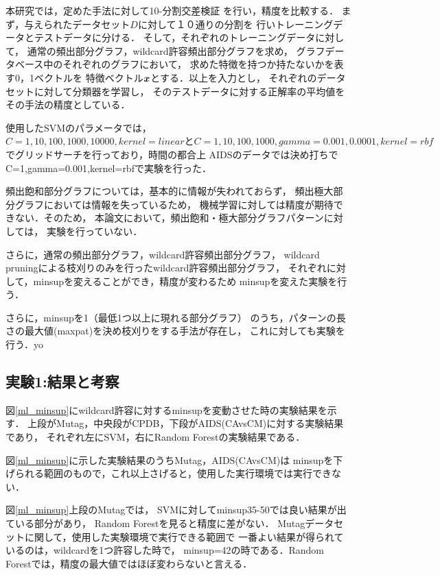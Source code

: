本研究では，定めた手法に対して10-分割交差検証
を行い，精度を比較する．
まず，与えられたデータセット$D$に対して１０通りの分割を
行いトレーニングデータとテストデータに分ける．
そして，それぞれのトレーニングデータに対して，
通常の頻出部分グラフ，wildcard許容頻出部分グラフを求め，
グラフデータベース中のそれぞれのグラフにおいて，
求めた特徴を持つか持たないかを表す0，1ベクトルを
特徴ベクトル$\mbox{\boldmath $x$}$とする．以上を入力とし，
それぞれのデータセットに対して分類器を学習し，
そのテストデータに対する正解率の平均値をその手法の精度としている．

使用したSVMのパラメータでは，
$C=1, 10,100,1000,10000, kernel=linearと
C=1,10,100,1000,gamma=0.001,0.0001,kernel=rbf$
でグリッドサーチを行っており，時間の都合上
AIDSのデータでは決め打ちでC=1,gamma=0.001,kernel=rbfで実験を行った．


頻出飽和部分グラフについては，基本的に情報が失われておらず，
頻出極大部分グラフにおいては情報を失っているため，
機械学習に対しては精度が期待できない．そのため，
本論文において，頻出飽和・極大部分グラフパターンに対しては，
実験を行っていない．

さらに，通常の頻出部分グラフ，wildcard許容頻出部分グラフ，
wildcard pruningによる枝刈りのみを行ったwildcard許容頻出部分グラフ，
それぞれに対して，minsupを変えることができ，精度が変わるため
minsupを変えた実験を行う．

さらに，minsupを1（最低1つ以上に現れる部分グラフ）
のうち，パターンの長さの最大値(maxpat)を決め枝刈りをする手法が存在し，%
これに対しても実験を行う．yo
\fi
\subsection{実験1:結果と考察}
\label{subsec:exp1}%

図\ref{ml_minsup}にwildcard許容に対するminsupを変動させた時の実験結果を示す．
上段がMutag，中央段がCPDB，下段がAIDS(CAvsCM)に対する実験結果であり，
それぞれ左にSVM，右にRandom Forestの実験結果である．

図\ref{ml_minsup}に示した実験結果のうちMutag，AIDS(CAvsCM)は
minsupを下げられる範囲のもので，これ以上さげると，使用した実行環境では実行できない．

図\ref{ml_minsup}上段のMutagでは，
SVMに対してminsup35-50では良い結果が出ている部分があり，
Random Forestを見ると精度に差がない．
Mutagデータセットに関して，使用した実験環境で実行できる範囲で
一番よい結果が得られているのは，wildcardを1つ許容した時で，
minsup=42の時である．Random Forestでは，精度の最大値ではほぼ変わらないと言える．

